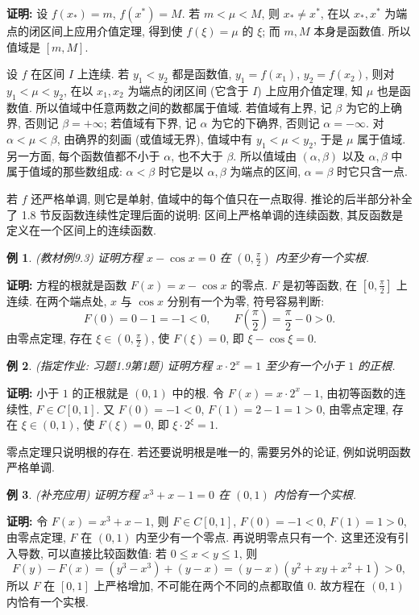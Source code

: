 \documentclass[UTF8,openany]{ctexbook}
\theoremstyle{chinesetextbook}
\newtheorem{example}{例}[section]
\newenvironment{cnproof}{\par\indent\textbf{证明:} \ignorespaces}{\par}
\begin{document}
\begin{cnproof}
设 $f(x_*)=m$, $f(x^*)=M$. 若 $m<\mu<M$, 则 $x_*\ne x^*$, 在以 $x_*,x^*$ 为端点的闭区间上应用介值定理, 得到使 $f(\xi)=\mu$ 的 $\xi$; 而 $m,M$ 本身是函数值. 所以值域是 $[m,M]$.

设 $f$ 在区间 $I$ 上连续. 若 $y_1<y_2$ 都是函数值, $y_1=f(x_1)$, $y_2=f(x_2)$, 则对 $y_1<\mu<y_2$, 在以 $x_1,x_2$ 为端点的闭区间 (它含于 $I$) 上应用介值定理, 知 $\mu$ 也是函数值. 所以值域中任意两数之间的数都属于值域. 若值域有上界, 记 $\beta$ 为它的上确界, 否则记 $\beta=+\infty$; 若值域有下界, 记 $\alpha$ 为它的下确界, 否则记 $\alpha=-\infty$. 对 $\alpha<\mu<\beta$, 由确界的刻画 (或值域无界), 值域中有 $y_1<\mu<y_2$, 于是 $\mu$ 属于值域. 另一方面, 每个函数值都不小于 $\alpha$, 也不大于 $\beta$. 所以值域由 $(\alpha,\beta)$ 以及 $\alpha,\beta$ 中属于值域的那些数组成: $\alpha<\beta$ 时它是以 $\alpha,\beta$ 为端点的区间, $\alpha=\beta$ 时它只含一点.
\end{cnproof}
若 $f$ 还严格单调, 则它是单射, 值域中的每个值只在一点取得. 推论的后半部分补全了 1.8 节反函数连续性定理后面的说明: 区间上严格单调的连续函数, 其反函数是定义在一个区间上的连续函数.
\begin{example}
\textnormal{(教材例9.3)} 证明方程 $x-\cos x=0$ 在 $\displaystyle\left(0,\frac\pi2\right)$ 内至少有一个实根.
\end{example}
\begin{cnproof}
方程的根就是函数 $F(x)=x-\cos x$ 的零点. $F$ 是初等函数, 在 $\displaystyle\left[0,\frac\pi2\right]$ 上连续. 在两个端点处, $x$ 与 $\cos x$ 分别有一个为零, 符号容易判断:
\[
F(0)=0-1=-1<0,\qquad F\!\left(\frac\pi2\right)=\frac\pi2-0>0.
\]
由零点定理, 存在 $\displaystyle\xi\in\left(0,\frac\pi2\right)$, 使 $F(\xi)=0$, 即 $\xi-\cos\xi=0$.
\end{cnproof}
\begin{example}
\textnormal{(指定作业: 习题1.9第1题)} 证明方程 $x\cdot2^x=1$ 至少有一个小于 $1$ 的正根.
\end{example}
\begin{cnproof}
小于 $1$ 的正根就是 $(0,1)$ 中的根. 令 $F(x)=x\cdot2^x-1$, 由初等函数的连续性, $F\in C[0,1]$. 又 $F(0)=-1<0$, $F(1)=2-1=1>0$, 由零点定理, 存在 $\xi\in(0,1)$, 使 $F(\xi)=0$, 即 $\xi\cdot2^\xi=1$.
\end{cnproof}
零点定理只说明根的存在. 若还要说明根是唯一的, 需要另外的论证, 例如说明函数严格单调.
\begin{example}
\textnormal{(补充应用)} 证明方程 $x^3+x-1=0$ 在 $(0,1)$ 内恰有一个实根.
\end{example}
\begin{cnproof}
令 $F(x)=x^3+x-1$, 则 $F\in C[0,1]$, $F(0)=-1<0$, $F(1)=1>0$, 由零点定理, $F$ 在 $(0,1)$ 内至少有一个零点. 再说明零点只有一个. 这里还没有引入导数, 可以直接比较函数值: 若 $0\le x<y\le1$, 则
\[
F(y)-F(x)=(y^3-x^3)+(y-x)=(y-x)(y^2+xy+x^2+1)>0,
\]
所以 $F$ 在 $[0,1]$ 上严格增加, 不可能在两个不同的点都取值 $0$. 故方程在 $(0,1)$ 内恰有一个实根.
\end{cnproof}
\end{document}
